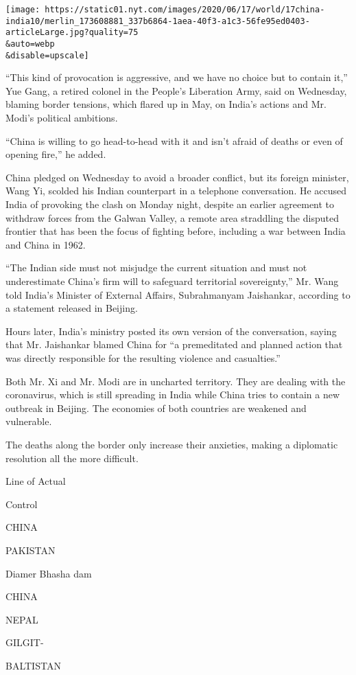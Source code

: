 \texttt{[image: https://static01.nyt.com/images/2020/06/17/world/17china-india10/merlin\_173608881\_337b6864-1aea-40f3-a1c3-56fe95ed0403-articleLarge.jpg?quality=75\\\&auto=webp\\\&disable=upscale]}

``This kind of provocation is aggressive, and we have no choice but to
contain it,'' Yue Gang, a retired colonel in the People's Liberation
Army, said on Wednesday, blaming border tensions, which flared up in
May, on India's actions and Mr. Modi's political ambitions.

``China is willing to go head-to-head with it and isn't afraid of deaths
or even of opening fire,'' he added.

China pledged on Wednesday to avoid a broader conflict, but its foreign
minister, Wang Yi, scolded his Indian counterpart in a telephone
conversation. He accused India of provoking the clash on Monday night,
despite an earlier agreement to withdraw forces from the Galwan Valley,
a remote area straddling the disputed frontier that has been the focus
of fighting before, including a war between India and China in 1962.

``The Indian side must not misjudge the current situation and must not
underestimate China's firm will to safeguard territorial sovereignty,''
Mr. Wang told India's Minister of External Affairs, Subrahmanyam
Jaishankar, according to a statement released in Beijing.

Hours later, India's ministry posted its own version of the
conversation, saying that Mr. Jaishankar blamed China for ``a
premeditated and planned action that was directly responsible for the
resulting violence and casualties.''

Both Mr. Xi and Mr. Modi are in uncharted territory. They are dealing
with the coronavirus, which is still spreading in India while China
tries to contain a new outbreak in Beijing. The economies of both
countries are weakened and vulnerable.

The deaths along the border only increase their anxieties, making a
diplomatic resolution all the more difficult.

Line of Actual

Control

CHINA

PAKISTAN

Diamer Bhasha dam

CHINA

NEPAL

GILGIT-

BALTISTAN

